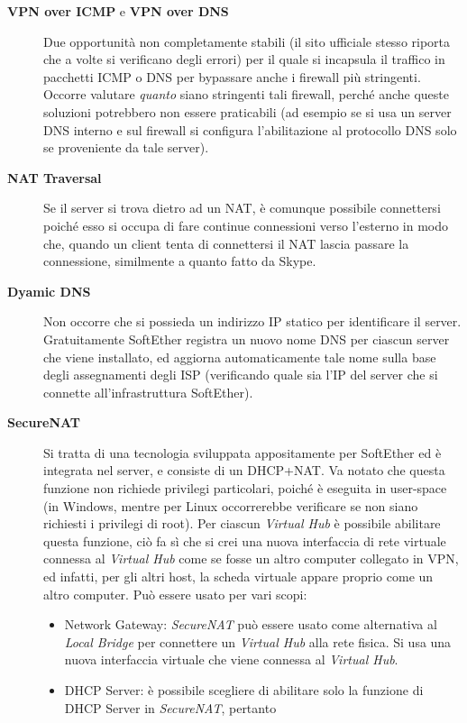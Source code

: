 \begin{description}
  \item[\textbf{VPN over ICMP} e \textbf{VPN over DNS}]Due opportunità non completamente stabili (il sito ufficiale stesso
  riporta che a volte si verificano degli errori) per il quale si incapsula il traffico in pacchetti ICMP
  o DNS per bypassare anche i firewall più stringenti. Occorre valutare \textit{quanto}
  siano stringenti tali firewall, perché anche queste soluzioni potrebbero non essere
  praticabili (ad esempio se si usa un server DNS interno e sul firewall si configura l'abilitazione
  al protocollo DNS solo se proveniente da tale server).
  \item[\textbf{NAT Traversal}]Se il server si trova dietro ad un NAT, è comunque possibile connettersi poiché
  esso si occupa di fare continue connessioni verso l'esterno in modo che, quando un client tenta di connettersi
  il NAT lascia passare la connessione, similmente a quanto fatto da Skype.
  \item[\textbf{Dyamic DNS}]Non occorre che si possieda un indirizzo IP statico per identificare il server.
  Gratuitamente SoftEther registra un nuovo nome DNS per ciascun server che viene installato, ed aggiorna
  automaticamente tale nome sulla base degli assegnamenti degli ISP (verificando quale sia l'IP
  del server che si connette all'infrastruttura SoftEther).
  \item[\textbf{SecureNAT}]Si tratta di una tecnologia sviluppata appositamente per SoftEther ed è integrata
  nel server, e consiste di un DHCP+NAT. Va notato che questa funzione non richiede privilegi particolari,
  poiché è eseguita in user-space (in Windows, mentre per Linux occorrerebbe verificare se non siano
  richiesti i privilegi di root).
  Per ciascun \textit{Virtual Hub} è possibile abilitare questa funzione, ciò fa sì che si crei
  una nuova interfaccia di rete virtuale connessa al \textit{Virtual Hub}
  come se fosse un altro computer collegato in VPN, ed infatti, per gli altri host, la scheda virtuale appare proprio
  come un altro computer. Può essere usato per vari scopi:
  \begin{itemize}
    \item Network Gateway: \textit{SecureNAT} può essere usato come alternativa al \textit{Local Bridge} per
    connettere un \textit{Virtual Hub} alla rete fisica. Si usa una nuova interfaccia virtuale che viene connessa al \textit{Virtual Hub}.
    \item DHCP Server: è possibile scegliere di abilitare solo la funzione di DHCP Server in \textit{SecureNAT}, pertanto

\end{itemize}
\end{description}
